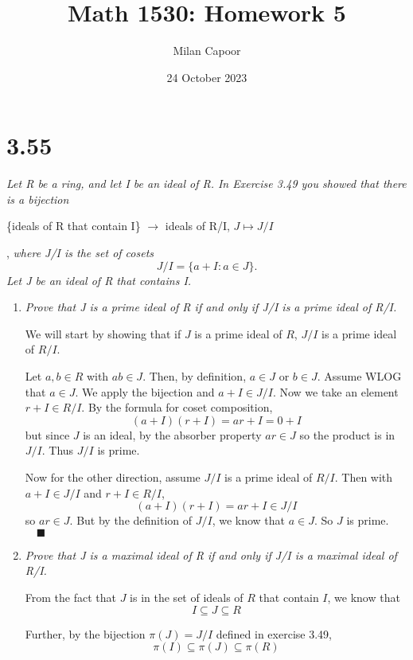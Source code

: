 \documentclass[12pt]{article}
\title{Math 1530: Homework 5}
\author{Milan Capoor}
\date{24 October 2023}
\newcommand{\qed}{\quad \blacksquare}
\begin{document}
\maketitle
\section*{3.55}
    \emph{Let R be a ring, and let I be an ideal of R. In Exercise 3.49 you showed that there is a bijection}
    \begin{center}
        \{ideals of R that contain I\} $\to$ {ideals of R/I}, \quad $J \mapsto J/I$
    \end{center},
    \emph{where J/I is the set of cosets}
    \[J/I = \{a + I : a \in J\}.\]
    \emph{Let J be an ideal of R that contains I.}
    \begin{enumerate}
        \item \emph{Prove that J is a prime ideal of R if and only if J/I is a prime ideal of R/I.}
        
            \color{blue}
                We will start by showing that if $J$ is a prime ideal of $R$, $J/I$ is a prime ideal of $R/I$. 

                Let $a, b \in R$ with $ab \in J$. Then, by definition, $a \in J$ or $b \in J$. Assume WLOG that $a \in J$. We apply the bijection and $a + I \in J/I$. Now we take an element $r + I \in R/I$. By the formula for coset composition, 
                \[(a + I)(r + I) = ar + I = 0 + I\]
                but since $J$ is an ideal, by the absorber property $ar \in J$ so the product is in $J/I$. Thus $J/I$ is prime. 
                
                Now for the other direction, assume $J/I$ is a prime ideal of $R/I$. Then with $a + I \in J/I$ and $r + I \in R/I$, 
                \[(a + I)(r + I) = ar + I \in J/I\]
                so $ar \in J$. But by the definition of $J/I$, we know that $a \in J$. So $J$ is prime. $\qed$
            \color{black}

        \item \emph{Prove that J is a maximal ideal of R if and only if J/I is a maximal ideal of R/I.}
        
            \color{blue}
                From the fact that $J$ is in the set of ideals of $R$ that contain $I$, we know that 
                \[I \subseteq J \subseteq R\]

                Further, by the bijection $\pi(J) = J/I$ defined in exercise 3.49,
                \[\pi(I) \subseteq \pi(J) \subseteq \pi(R)\]
                

\end{enumerate}
\end{document}
